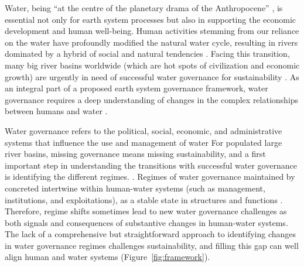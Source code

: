 \label{Intro.}
Water, being ``at the centre of the planetary drama of the Anthropocene'' \cite{gleesonIlluminatingwatercycle2020}, is essential not only for earth system processes but also in supporting the economic development and human well-being.
Human activities stemming from our reliance on the water have profoundly modified the natural water cycle, resulting in rivers dominated by a hybrid of social and natural tendencies
\cite{gleesonIlluminatingwatercycle2020,sivapalanSociohydrologynewscience2012,qinTheoreticalframeworkdualistic2014,abbottwatercycleAnthropocene2019,leviaHomogenizationterrestrialwater2020}.
Facing this transition, many big river basins worldwide (which are hot spots of civilization and economic growth) are urgently in need of successful water governance for sustainability
\cite{bestAnthropogenicstressesworld2019,falkenmarkUnderstandingwaterresilience2019,dibaldassarreSociohydrologyScientificChallenges2019}.
As an integral part of a proposed earth system governance framework, water governance requires a deep understanding of changes in the complex relationships between humans and water
\cite{dibaldassarreSociohydrologyScientificChallenges2019,biermannNavigatingAnthropoceneImproving2012,steffenemergenceevolutionEarth2020}.

Water governance refers to the political, social, economic, and administrative systems that influence the use and management of water %
For populated large river basins, missing governance means missing sustainability, and a first important step in understanding the transitions with successful water governance is identifying the different regimes.
\cite{undpwatergovernancefacilityWaterGovernanceIssue}.
Regimes of water governance maintained by concreted intertwine within human-water systems (such as management, institutions, and exploitations), as a stable state in structures and functions
\cite{carpenterEarlyWarningsRegime2011,rochaCascadingregimeshifts2018, gregrCascadingsocialecologicalcosts2020}.
Therefore, regime shifts sometimes lead to new water governance challenges as both signals and consequences of substantive changes in human-water systems.
The lack of a comprehensive but straightforward approach to identifying changes in water governance regimes challenges sustainability, and filling this gap can well align human and water systems (Figure~\ref{fig:framework}).


